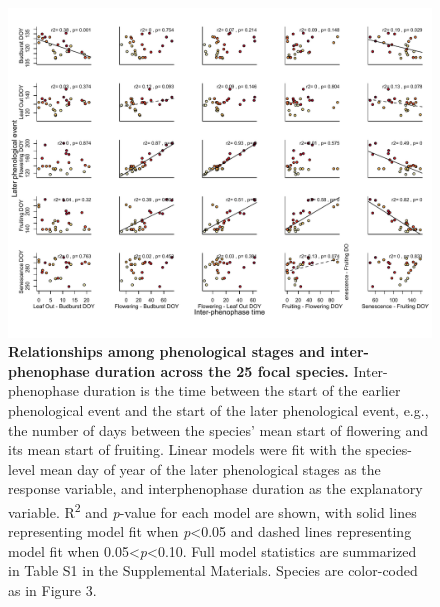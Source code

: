 \documentclass{article}
\begin{document}
\begin{figure}[h]
  \centering
  \includegraphics{../analyses/figures/adj_stagesmegaplot_col_YOR.pdf}
  \caption{\textbf{Relationships among phenological stages and inter-phenophase duration across the 25 focal species.} Inter-phenophase duration is the time between the start of the earlier phenological event and the start of the later phenological event, e.g., the number of days between the species' mean start of flowering and its mean start of fruiting. Linear models were fit with the species-level mean day of year of the later phenological stages as the response variable, and interphenophase duration as the explanatory variable. R\textsuperscript{2} and \textit{p}-value for each model are shown, with solid lines representing model fit when \textit{p}<0.05 and dashed lines representing model fit when 0.05<\textit{p}<0.10. Full model statistics are summarized in Table S1 in the Supplemental Materials. Species are color-coded as in Figure 3.}
  \label{fig:inter}
   \end{figure}


\end{document}
